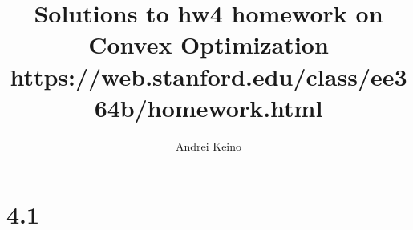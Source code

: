 \documentclass{article}
\begin{document}
\title{Solutions to hw4 homework on Convex Optimization https://web.stanford.edu/class/ee364b/homework.html}
\author{Andrei Keino}
\maketitle

\section*{4.1} 
\end{document}
